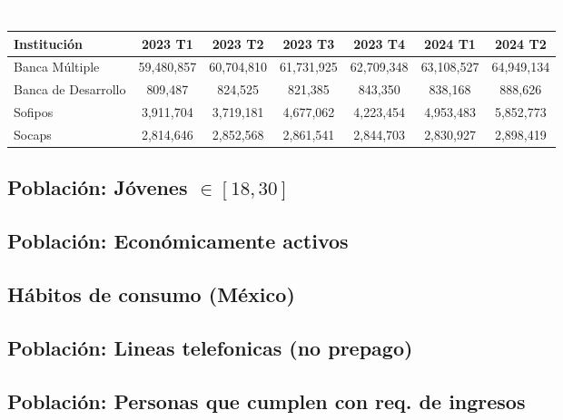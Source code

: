 \begin{table}[h!]
    \centering
    \caption{\textcolor{white}{Número total de créditos otorgados por tipo de institución (trimestral)}}
    \color{white}
    \begin{tabular}{lcccccc}
        \hline
        \textbf{Institución} & \textbf{2023 T1} & \textbf{2023 T2} & \textbf{2023 T3} & \textbf{2023 T4} & \textbf{2024 T1} & \textbf{2024 T2} \\
        \hline
        Banca Múltiple       &       59,480,857         &        60,704,810         &         61,731,925        &        62,709,348        &         63,108,527        &          64,949,134         \\
        Banca de Desarrollo  &       809,487        &        824,525         &         821,385         &         843,350         &         838,168        &           888,626         \\
        Sofipos              &        3,911,704          &          3,719,181       &         4,677,062          &         4,223,454        &        4,953,483         &           5,852,773       \\
        Socaps               &        2,814,646        &        2,852,568         &        2,861,541         &         2,844,703       &        2,830,927         &           2,898,419       \\
        \hline
    \end{tabular}
    \label{tab:total_creditos_trimestrales}
\end{table}


\subsection*{Población: Jóvenes $\in[18,30]$}

\subsection*{Población: Económicamente activos}

\subsection*{Hábitos de consumo (México)}

\subsection*{Población: Lineas telefonicas (no prepago)}

\subsection*{Población: Personas que cumplen con req. de ingresos}